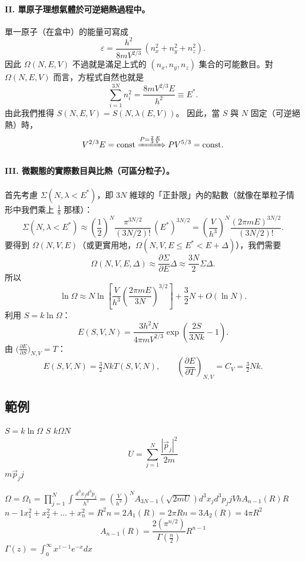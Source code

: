 \paragraph{II. 單原子理想氣體於可逆絕熱過程中。}
單一原子（在盒中）的能量可寫成
\[
    \varepsilon = \frac{h^{2}}{8mV^{2/3}}\,(n_x^{2}+n_y^{2}+n_z^{2}).
\]
因此 $\Omega(N,E,V)$ 不過就是滿足上式的 $(n_x,n_y,n_z)$ 集合的可能數目。對 $\Omega(N,E,V)$ 而言，方程式自然也就是
\[
    \sum_{i=1}^{3N} n_i^{2} = \frac{8m V^{2/3} E}{h^{2}} \equiv E^{*}.
\]
由此我們推得 $S(N,E,V) = S(N,\lambda(E,V))$。
因此，當 $S$ 與 $N$ 固定（可逆絕熱）時，
\[
    V^{2/3}E = \mathrm{const} \xRightarrow{P=\frac{2}{3}\frac{E}{V}} P V^{5/3} = \mathrm{const}.
\]

\paragraph{III. 微觀態的實際數目與比熱（可區分粒子）。}
首先考慮 $\Sigma(N,\lambda<E^{*})$，即 $3N$ 維球的「正卦限」內的點數（就像在單粒子情形中我們乘上 $\frac{1}{8}$ 那樣）：
\[
    \Sigma(N,\lambda<E^{*}) \approx \left(\frac{1}{2}\right)^{N}\frac{\pi^{3N/2}}{(3N/2)!}\,(E^{*})^{3N/2}
    = \left(\frac{V}{h^{3}}\right)^{N}\frac{(2\pi m E)^{3N/2}}{(3N/2)!}.
\]
要得到 $\Omega(N,V,E)$（或更實用地，$\Omega(N,V, E\le E^{*}<E+\Delta)$），我們需要
\[
    \Omega(N,V,E,\Delta) \approx \frac{\partial\Sigma}{\partial E}\Delta \approx \frac{3N}{2}\Sigma\Delta.
\]
所以
\[
    \boxed{\ln\Omega \approx N\ln\!\left[\frac{V}{h^{3}}\!\left(\frac{2\pi mE}{3N}\right)^{3/2}\right] + \frac{3}{2}N + O(\ln N).}
\]
利用 $S=k\ln\Omega$：
\[
    E(S,V,N) = \frac{3 h^{2} N}{4\pi m V^{2/3}}\exp\!\left(\frac{2S}{3Nk}-1\right).
\]
由 $\bigl(\frac{\partial E}{\partial S}\bigr)_{N,V} = T$：
\[
    E(S,V,N) = \tfrac{3}{2} N k T(S,V,N), \qquad
    \left(\frac{\partial E}{\partial T}\right)_{N,V} = \boxed{C_V = \tfrac{3}{2} N k}.
\]

\subsection{範例}

$S=k \ln \Omega$ $S$ $k$$\Omega$$N$
\[ U=\sum_{j=1}^{N}\frac{|\vec{p}_{j}|^{2}}{2m} \]
$m$$\vec{p}_{j}$$j$

$\Omega=\Omega_{1}=\prod_{j=1}^{N}\int\frac{d^{3}x_{j}d^{3}p_{j}}{h^{3}}=\left(\frac{V}{h^{3}}\right)^{N}A_{3N-1}(\sqrt{2mU})$$d^{3}x_{j}d^{3}p_{j}$$j$$V$$h$$A_{n-1}(R)$$R$$n-1$$x_{1}^{2}+x_{2}^{2}+\dots+x_{n}^{2}=R^{2}$$n=2$$A_{1}(R)=2\pi R$$n=3$$A_{2}(R)=4\pi R^{2}$
\[ A_{n-1}(R)=\frac{2(\pi^{n/2})}{\Gamma(\frac{n}{2})}R^{n-1} \]
$\Gamma(z)=\int_{0}^{\infty}x^{z-1}e^{-x}dx$

